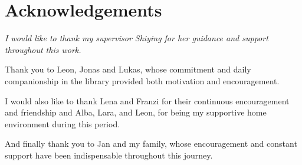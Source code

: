 \chapter*{Acknowledgements}

\begin{center}
  \begin{minipage}{0.85\linewidth}
    \itshape
    I would like to thank my supervisor Shiying for her guidance and support throughout this work.

    Thank you to Leon, Jonas and Lukas, whose commitment and daily companionship in the library provided both motivation and encouragement.

   I would also like to thank Lena and Franzi for their continuous encouragement and friendship and Alba, Lara, and Leon, for being my supportive home environment during this period.

    And finally thank you to Jan and my family, whose encouragement and constant support have been indispensable throughout this journey.
  \end{minipage}
\end{center}

